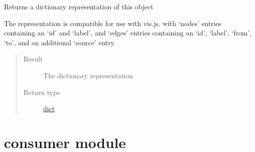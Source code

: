 \documentclass[letterpaper,10pt,english]{sphinxmanual}
\begin{document}
\begin{fulllineitems}
\begin{fulllineitems}
\begin{quote}
\begin{description}
\end{description}\end{quote}

\end{fulllineitems}


\begin{fulllineitems}
\label{\detokenize{concept_map:concept_map.ConceptMap.to_dict}}
Returns a dictionary representation of this object

The representation is compatible for use with vis.js, with `nodes' entries containing an `id' and `label', and `edges' entries containing an `id', `label', `from', `to', and an additional `source' entry
\begin{quote}\begin{description}
\item[{Result}] \leavevmode
The dictionary representation

\item[{Return type}] \leavevmode
\href{https://docs.python.org/2/library/stdtypes.html\#dict}{dict}

\end{description}\end{quote}

\end{fulllineitems}


\end{fulllineitems}



\chapter{consumer module}
\label{\detokenize{consumer:module-consumer}}\label{\detokenize{consumer:consumer-module}}\label{\detokenize{consumer::doc}}
\end{document}
